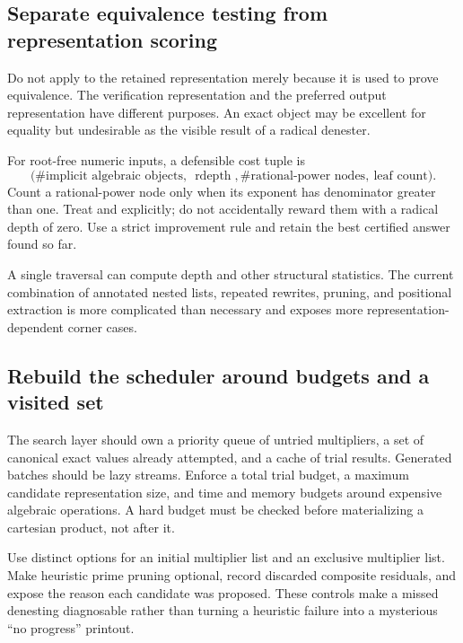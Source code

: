 \documentclass[11pt,letterpaper]{article}
\newcommand{\code}[1]{\texttt{\detokenize{#1}}}
\DeclareMathOperator{\depthrad}{rdepth}
\theoremstyle{definition}
\begin{document}
\subsection{Separate equivalence testing from representation scoring}
Do not apply \code{RootReduce} to the retained representation merely because it is
used to prove equivalence. The verification representation and the preferred
output representation have different purposes. An exact \code{Root} object may
be excellent for equality but undesirable as the visible result of a radical
denester.

For root-free numeric inputs, a defensible cost tuple is
\[
 \bigl(\#\text{implicit algebraic objects},\ \depthrad,
        \#\text{rational-power nodes},\ \text{leaf count}\bigr).
\]
Count a rational-power node only when its exponent has denominator greater than
one. Treat \code{Root} and \code{AlgebraicNumber} explicitly; do not accidentally
reward them with a radical depth of zero. Use a strict improvement rule and retain
the best certified answer found so far.

A single traversal can compute depth and other structural statistics. The current
combination of annotated nested lists, repeated rewrites, pruning, and positional
extraction is more complicated than necessary and exposes more representation-
dependent corner cases.

\subsection{Rebuild the scheduler around budgets and a visited set}
The search layer should own a priority queue of untried multipliers, a set of
canonical exact values already attempted, and a cache of trial results. Generated
batches should be lazy streams. Enforce a total trial budget, a maximum candidate
representation size, and time and memory budgets around expensive algebraic
operations. A hard budget must be checked before materializing a cartesian product,
not after it.

Use distinct options for an initial multiplier list and an exclusive multiplier
list. Make heuristic prime pruning optional, record discarded composite residuals,
and expose the reason each candidate was proposed. These controls make a missed
denesting diagnosable rather than turning a heuristic failure into a mysterious
``no progress'' printout.
\end{document}
